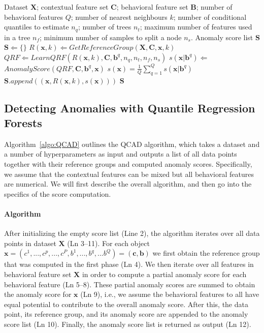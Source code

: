 \documentclass[pdflatex,sn-basic]{sn-jnl}%
\theoremstyle{thmstyleone}%
\theoremstyle{thmstyletwo}%
\theoremstyle{thmstylethree}%
\begin{document}
\begin{algorithm}
\caption{Quantile-based Contextual Anomaly Detection (QCAD)}\label{algo:QCAD}
\begin{algorithmic}[1]
\Require Dataset $\mathbf{X}$; contextual feature set  $\mathbf{C}$; behavioral feature set $\mathbf{B}$; number of behavioral features $Q$; number of nearest neighbours $k$; number of conditional quantiles to estimate $n_q$; number of trees $n_t$; maximum number of features used in a tree $n_f$; minimum number of samples to split a node $n_s$.
\Ensure Anomaly score list $\mathbf{S}$
\State $\mathbf{S} \Leftarrow \{\}$
    \State $R(\mathbf{x},k) \Leftarrow GetReferenceGroup (\mathbf{X},\mathbf{C},\mathbf{x},k)$
    \State $QRF \Leftarrow LearnQRF(R(\mathbf{x},k),\mathbf{C},\mathbf{b}^{q}, n_q, n_t, n_f, n_s)$
    \State $s(\mathbf{x}\rvert\mathbf{b}^{q}) \Leftarrow$ $AnomalyScore(QRF, \mathbf{C},\mathbf{b}^{q}, \mathbf{x})$
    \EndFor
    \State $s(\mathbf{x}) = \frac{1}{Q}\sum_{q = 1}^{Q}s(\mathbf{x}\rvert\mathbf{b}^{q})$
     \State  $\mathbf{S}.append((\mathbf{x},R(\mathbf{x},k),s(\mathbf{x})))$
\EndFor
\State \Return $\mathbf{S}$
\EndProcedure
\end{algorithmic}
\end{algorithm}

\subsection{Detecting Anomalies with Quantile Regression Forests}
\label{qcad:ad}

Algorithm~\ref{algo:QCAD} outlines the QCAD algorithm, which takes a dataset and a number of hyperparameters as input and outputs a list of all data points together with their reference groups and computed anomaly scores.  Specifically, we assume that the contextual features can be mixed but all  behavioral features are numerical. We will first describe the overall algorithm, and then go into the specifics of the score computation.

\paragraph{Algorithm} 

After initializing the empty score list (Line 2), the algorithm iterates over all data points in dataset $\mathbf{X}$ (Ln 3--11). For each object $\mathbf{x} =(c^{1},...,c^{p},...,c^{P},b^{1},...,b^{q},...b^{Q})=(\mathbf{c},\mathbf{b})$ we first obtain the reference group that was computed in the first phase (Ln 4). We then iterate over all features in behavioral feature set $\mathbf{X}$ in order to compute a partial anomaly score for each behavioral feature (Ln 5--8). These partial anomaly scores are summed to obtain the anomaly score for $\mathbf{x}$ (Ln 9), i.e., we assume the behavioral features to all have equal potential to contribute to the overall anomaly score. After this, the data point, its reference group, and its anomaly score are appended to the anomaly score list (Ln 10). Finally, the anomaly score list is returned as output (Ln 12).
\end{document}
